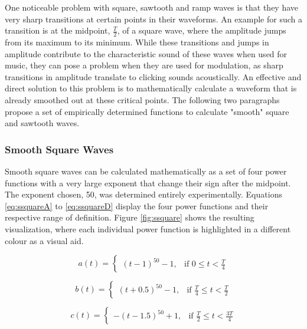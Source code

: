 One noticeable problem with square, sawtooth and ramp waves is that they have very sharp transitions at certain points in their waveforms. An example for such a transition is at the midpoint, $\frac{T}{2}$, of a square wave, where the amplitude jumps from its maximum to its minimum. While these transitions and jumps in amplitude contribute to the characteristic sound of these waves when used for music, they can pose a problem when they are used for modulation, as sharp transitions in amplitude translate to clicking sounds acoustically. An effective and direct solution to this problem is to mathematically calculate a waveform that is already smoothed out at these critical points. The following two paragraphs propose a set of empirically determined functions to calculate "smooth" square and sawtooth waves.

\subsubsection{Smooth Square Waves}

Smooth square waves can be calculated mathematically as a set of four power functions with a very large exponent that change their sign after the midpoint. The exponent chosen, 50, was determined entirely experimentally. Equations \ref{eq:ssquareA} to \ref{eq:ssquareD} display the four power functions and their respective range of definition. Figure \ref{fig:ssquare} shows the resulting visualization, where each individual power function is highlighted in a different colour as a visual aid.

\begin{equation}
  a(t) =
  \begin{cases}
    (t - 1)^{50} - 1,& \text{if } 0 \leq t < \frac{T}{4}
  \end{cases}
  \label{eq:ssquareA}
\end{equation}

\begin{equation}
  b(t) =
  \begin{cases}
    (t + 0.5)^{50} - 1,& \text{if } \frac{T}{4} \leq t < \frac{T}{2}
  \end{cases}
  \label{eq:ssquareB}
\end{equation}

\begin{equation}
  c(t) =
  \begin{cases}
    -(t - 1.5)^{50} + 1,& \text{if } \frac{T}{2} \leq t < \frac{3T}{4}
  \end{cases}
  \label{eq:ssquareC}
\end{equation}

